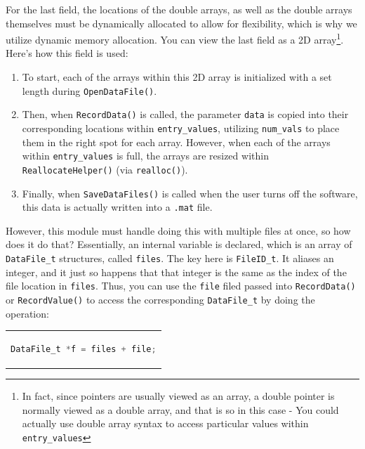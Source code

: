 \documentclass[letterpaper]{article}
\begin{document}
For the last field, the locations of the double arrays, as well as the double arrays themselves must be dynamically allocated to allow for flexibility, which is why we utilize dynamic memory allocation. You can view the last field as a 2D array\footnote{In fact, since pointers are usually viewed as an array, a double pointer is normally viewed as a double array, and that is so in this case - You could actually use double array syntax to access particular values within \texttt{entry\_values}}. Here's how this field is used:
\begin{enumerate}
    \item To start, each of the arrays within this 2D array is initialized with a set length during \texttt{OpenDataFile()}.
    \item Then, when \texttt{RecordData()} is called, the parameter \texttt{data} is copied into their corresponding locations within \texttt{entry\_values}, utilizing \texttt{num\_vals} to place them in the right spot for each array. However, when each of the arrays within \texttt{entry\_values} is full, the arrays are resized within \texttt{ReallocateHelper()} (via \texttt{realloc()}). 
    \item Finally, when \texttt{SaveDataFiles()} is called when the user turns off the software, this data is actually written into a \texttt{.mat} file.
\end{enumerate}

However, this module must handle doing this with multiple files at once, so how does it do that? Essentially, an internal variable is declared, which is an array of \texttt{DataFile\_t} structures, called \texttt{files}. The key here is \texttt{FileID\_t}. It aliases an integer, and it just so happens that that integer is the same as the index of the file location in \texttt{files}. Thus, you can use the \texttt{file} filed passed into \texttt{RecordData()} or \texttt{RecordValue()} to access the corresponding \texttt{DataFile\_t} by doing the operation:

\begin{center}
    \begin{tabular}{c}
        \begin{lstlisting}[language=C]
DataFile_t *f = files + file;
        \end{lstlisting}
    \end{tabular}
\end{center}

\newpage
\end{document}
